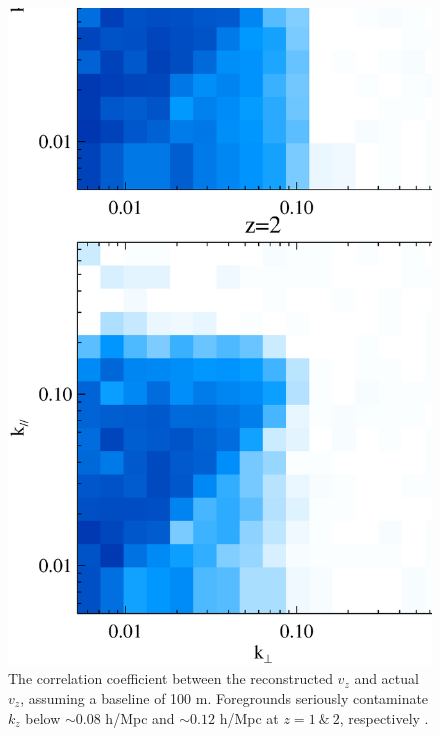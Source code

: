 \begin{figure}[btp]
\begin{minipage}[t]{0.33\linewidth}
{}
\label{fig:k3v}
\end{minipage}
\begin{minipage}[t]{0.33\linewidth}
\begin{center}
\includegraphics[width=\textwidth,height=1.7\textwidth]{figure/powv2d_z1z2_r15r10.eps}
\end{center}
\vspace{-0.7cm}
\caption{The correlation coefficient between the reconstructed $v_z$  and actual $v_z$, assuming a  baseline of 100 m. Foregrounds seriously contaminate $k_z$ below $\sim0.08$ h/Mpc and $\sim0.12$ h/Mpc at $z=1~\&~2$, respectively .}

\end{minipage}
\end{figure}

